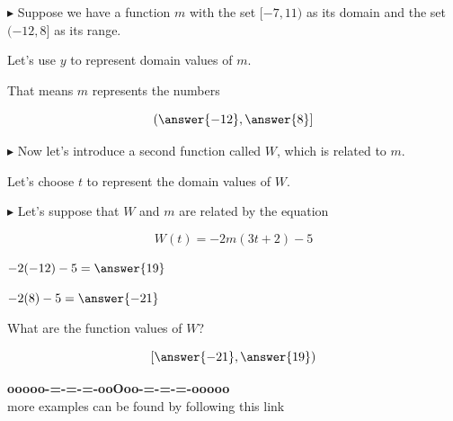 \documentclass{ximera}
\begin{document}
\begin{example}




\textbf{\textcolor{blue!55!black}{$\blacktriangleright$}}  Suppose we have a function $m$ with the set $[-7, 11)$ as its domain and the set $(-12, 8]$ as its range. 

Let's use $y$ to represent domain values of $m$.  



\begin{question}

That means $m$ represents the numbers 

\[
\left( \answer{-12}, \answer{8} \right]
\]

\end{question}






\textbf{\textcolor{blue!55!black}{$\blacktriangleright$}} Now let's introduce a second function called $W$, which is related to $m$. 

Let's choose $t$ to represent the domain values of $W$. 


\textbf{\textcolor{blue!55!black}{$\blacktriangleright$}} Let's suppose that $W$ and $m$ are related by the equation 

\[ 
W(t) = -2 m(3t + 2) - 5
\]





\begin{question}

$-2 (-12) - 5 = \answer{19}$ 

$-2 (8) - 5 = \answer{-21}$ 

\end{question}






\begin{question}

What are the function values of $W$?


\[
\left[ \answer{-21}, \answer{19} \right)
\]


\end{question}


\end{example}


















\begin{center}
\textbf{\textcolor{green!50!black}{ooooo-=-=-=-ooOoo-=-=-=-ooooo}} \\

more examples can be found by following this link\\ 

\end{center}
\end{document}
